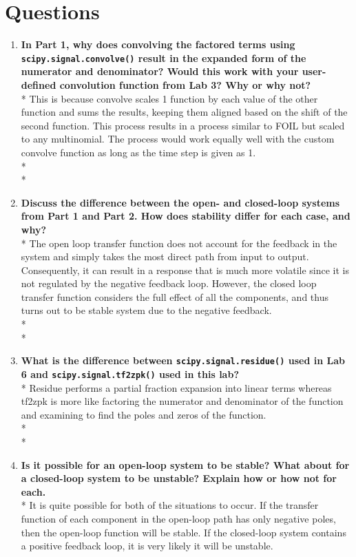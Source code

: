 \documentclass[12pt]{report}
\providecommand{\tightlist}{%
        \setlength{\itemsep}{0pt}\setlength{\parskip}{0pt}}
\def\br{\hspace*{\fill} \\* }
\begin{document}
\hypertarget{questions}{%
\chapter{Questions}\label{questions}}

\begin{enumerate}
\def\labelenumi{\arabic{enumi}.}
\tightlist
\item
  \textbf{In Part 1, why does convolving the factored terms using
  \texttt{scipy.signal.convolve()} result in the expanded form of the
  numerator and denominator? Would this work with your user-defined
  convolution function from Lab 3? Why or why not?}\br  This is because
  convolve scales 1 function by each value of the other function and
  sums the results, keeping them aligned based on the shift of the
  second function. This process results in a process similar to FOIL but
  scaled to any multinomial. The process would work equally well with
  the custom convolve function as long as the time step is given as 1.
  \br \br 
\item
  \textbf{Discuss the difference between the open- and closed-loop
  systems from Part 1 and Part 2. How does stability differ for each
  case, and why?}\br  The open loop transfer function does not account
  for the feedback in the system and simply takes the most direct path
  from input to output. Consequently, it can result in a response that
  is much more volatile since it is not regulated by the negative
  feedback loop. However, the closed loop transfer function considers
  the full effect of all the components, and thus turns out to be stable
  system due to the negative feedback.\br \br 
\item
  \textbf{What is the difference between \texttt{scipy.signal.residue()}
  used in Lab 6 and \texttt{scipy.signal.tf2zpk()} used in this
  lab?}\br  Residue performs a partial fraction expansion into linear
  terms whereas tf2zpk is more like factoring the numerator and
  denominator of the function and examining to find the poles and zeros
  of the function. \br \br 
\item
  \textbf{Is it possible for an open-loop system to be stable? What
  about for a closed-loop system to be unstable? Explain how or how not
  for each.}\br  It is quite possible for both of the situations to
  occur. If the transfer function of each component in the open-loop
  path has only negative poles, then the open-loop function will be
  stable. If the closed-loop system contains a positive feedback loop,
  it is very likely it will be unstable.
\end{enumerate}
\end{document}
